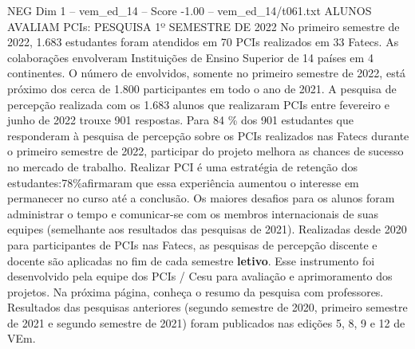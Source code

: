 \begin{textsample}{NEG Dim 1 – vem\_ed\_14 – Score -1.00 – vem\_ed\_14/t061.txt}  \label{ex:f1_neg_018}
ALUNOS AVALIAM PCIs: PESQUISA 1º SEMESTRE DE 2022 No primeiro semestre de 2022, 1.683 estudantes foram atendidos em 70 PCIs realizados em 33 Fatecs.
As colaborações envolveram Instituições de Ensino Superior de 14 países em 4 continentes.
O número de envolvidos, somente no primeiro semestre de 2022, está próximo dos cerca de 1.800 participantes em todo o ano de 2021.
A pesquisa de percepção realizada com os 1.683 alunos que realizaram PCIs entre fevereiro e junho de 2022 trouxe 901 respostas.
Para 84 \% dos 901 estudantes que responderam à pesquisa de percepção sobre os PCIs realizados nas Fatecs durante o primeiro semestre de 2022, participar do projeto melhora as chances de sucesso no mercado de trabalho.
Realizar PCI é uma estratégia de retenção dos estudantes:78\%afirmaram que essa experiência aumentou o interesse em permanecer no curso até a conclusão.
Os maiores desafios para os alunos foram administrar o tempo e comunicar-se com os membros internacionais de suas equipes (semelhante aos resultados das pesquisas de 2021).
Realizadas desde 2020 para participantes de PCIs nas Fatecs, as pesquisas de percepção discente e docente são aplicadas no fim de cada semestre \textbf{letivo}.
Esse instrumento foi desenvolvido pela equipe dos PCIs / Cesu para avaliação e aprimoramento dos projetos.
Na próxima página, conheça o resumo da pesquisa com professores.
Resultados das pesquisas anteriores (segundo semestre de 2020, primeiro semestre de 2021 e segundo semestre de 2021) foram publicados nas edições 5, 8, 9 e 12 de VEm.

\end{textsample}
